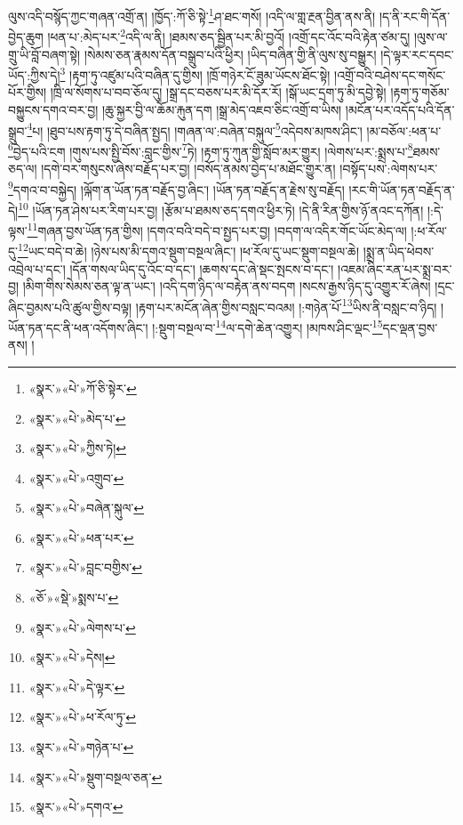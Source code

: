 ལུས་འདི་བསྙོད་ཀྱང་གཞན་འགྲོ་ན། །ཁྱོད་:ཀོ་ཅི་སྟེ་\footnote{«སྣར་»«པེ་»ཀོ་ཅི་སྟེར་}ཤ་ཐང་གསོ། །འདི་ལ་གླ་རྔན་བྱིན་ནས་ནི། །ད་ནི་རང་གི་དོན་བྱེད་ཆུག །ཕན་པ་:མེད་པར་\footnote{«སྣར་»«པེ་»མེད་པ་}འདི་ལ་ནི། །ཐམས་ཅད་སྦྱིན་པར་མི་བྱའོ། །འགྲོ་དང་འོང་བའི་རྟེན་ཙམ་དུ། །ལུས་ལ་གྲུ་ཡི་བློ་བཞག་སྟེ། །སེམས་ཅན་རྣམས་དོན་བསྒྲུབ་པའི་ཕྱིར། །ཡིད་བཞིན་གྱི་ནི་ལུས་སུ་བསྒྱུར། །དེ་ལྟར་རང་དབང་ཡོད་:ཀྱིས་དེ།\footnote{«སྣར་»«པེ་»ཀྱིས་ཏེ།} །རྟག་ཏུ་འཛུམ་པའི་བཞིན་དུ་གྱིས། །ཁྲོ་གཉེར་ངོ་ཟུམ་ཡོངས་ཐོང་སྟེ། །འགྲོ་བའི་བཤེས་དང་གསོང་པོར་གྱིས། །ཁྲི་ལ་སོགས་པ་བབ་ཅོལ་དུ། །སྒྲ་དང་བཅས་པར་མི་དོར་རོ། །སྒོ་ཡང་དྲག་ཏུ་མི་དབྱེ་སྟེ། །རྟག་ཏུ་གཅོམ་བསྐྱུངས་དགའ་བར་བྱ། །ཆུ་སྐྱར་བྱི་ལ་ཆོམ་རྐུན་དག །སྒྲ་མེད་འཇབ་ཅིང་འགྲོ་བ་ཡིས། །མངོན་པར་འདོད་པའི་དོན་སྒྲུབ་\footnote{«སྣར་»«པེ་»འགྲུབ་}པ། །ཐུབ་པས་རྟག་ཏུ་དེ་བཞིན་སྤྱད། །གཞན་ལ་:བཞེན་བསྐུལ་\footnote{«སྣར་»«པེ་»བཞེན་སྐུལ་}འདེབས་མཁས་ཤིང་། །མ་བཅོལ་:ཕན་པ་\footnote{«སྣར་»«པེ་»ཕན་པར་}བྱེད་པའི་ངག །གུས་པས་སྤྱི་བོས་:བླང་གྱིས་\footnote{«སྣར་»«པེ་»བླང་བགྱིས་}ཏེ། །རྟག་ཏུ་ཀུན་གྱི་སློབ་མར་གྱུར། །ལེགས་པར་:སྨྲས་པ་\footnote{«ཅོ་»«སྡེ་»སྨས་པ་}ཐམས་ཅད་ལ། །དགེ་བར་གསུངས་ཞེས་བརྗོད་པར་བྱ། །བསོད་ནམས་བྱེད་པ་མཐོང་གྱུར་ན། །བསྟོད་པས་:ལེགས་པར་\footnote{«སྣར་»«པེ་»ལེགས་པ་}དགའ་བ་བསྐྱེད། །ལྐོག་ན་ཡོན་ཏན་བརྗོད་བྱ་ཞིང་། །ཡོན་ཏན་བརྗོད་ན་རྗེས་སུ་བརྗོད། །རང་གི་ཡོན་ཏན་བརྗོད་ན་དེ།\footnote{«སྣར་»«པེ་»དེས།} །ཡོན་ཏན་ཤེས་པར་རིག་པར་བྱ། །རྩོམ་པ་ཐམས་ཅད་དགའ་ཕྱིར་ཏེ། །དེ་ནི་རིན་གྱིས་ཉོ་ནའང་དཀོན། །:དེ་ལྟས་\footnote{«སྣར་»«པེ་»དེ་ལྟར་}གཞན་བྱས་ཡོན་ཏན་གྱིས། །དགའ་བའི་བདེ་བ་སྤྱད་པར་བྱ། །བདག་ལ་འདིར་གོང་ཡོང་མེད་ལ། །:ཕ་རོལ་དུ་\footnote{«སྣར་»«པེ་»ཕ་རོལ་ཏུ་}ཡང་བདེ་བ་ཆེ། །ཉེས་པས་མི་དགའ་སྡུག་བསྔལ་ཞིང་། །ཕ་རོལ་དུ་ཡང་སྡུག་བསྔལ་ཆེ། །སྨྲ་ན་ཡིད་ཕེབས་འབྲེལ་པ་དང་། །དོན་གསལ་ཡིད་དུ་འོང་བ་དང་། །ཆགས་དང་ཞེ་སྡང་སྤངས་བ་དང་། །འཇམ་ཞིང་རན་པར་སྨྲ་བར་བྱ། །མིག་གིས་སེམས་ཅན་ལྟ་ན་ཡང་། །འདི་དག་ཉིད་ལ་བརྟེན་ནས་བདག །སངས་རྒྱས་ཉིད་དུ་འགྱུར་རོ་ཞེས། །དྲང་ཞིང་བྱམས་པའི་ཚུལ་གྱིས་བལྟ། །རྟག་པར་མངོན་ཞེན་གྱིས་བསླང་བའམ། །:གཉེན་པོ་\footnote{«སྣར་»«པེ་»གཉེན་པ་}ཡིས་ནི་བསླང་བ་ཉིད། །ཡོན་ཏན་དང་ནི་ཕན་འདོགས་ཞིང་། །:སྡུག་བསྔལ་བ་\footnote{«སྣར་»«པེ་»སྡུག་བསྔལ་ཅན་}ལ་དགེ་ཆེན་འགྱུར། །མཁས་ཤིང་ལྡང་\footnote{«སྣར་»«པེ་»དགའ་}དང་ལྡན་བྱས་ནས། །

